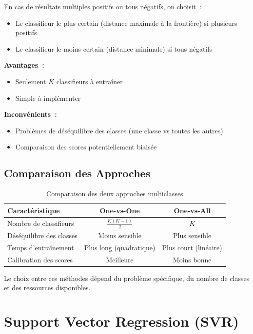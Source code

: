 En cas de résultats multiples positifs ou tous négatifs, on choisit~:
\begin{itemize}
    \item Le classifieur le plus certain (distance maximale à la frontière) si plusieurs positifs
    \item Le classifieur le moins certain (distance minimale) si tous négatifs
\end{itemize}

\textbf{Avantages~:}
\begin{itemize}
    \item Seulement $K$ classifieurs à entraîner
    \item Simple à implémenter
\end{itemize}

\textbf{Inconvénients~:}
\begin{itemize}
    \item Problèmes de déséquilibre des classes (une classe vs toutes les autres)
    \item Comparaison des scores potentiellement biaisée
\end{itemize}

\subsection{Comparaison des Approches}

\begin{table}[h]
    \centering
    \begin{tabular}{|l|c|c|}
        \hline
        \textbf{Caractéristique} & \textbf{One-vs-One} & \textbf{One-vs-All} \\
        \hline
        Nombre de classifieurs   & $\frac{K(K-1)}{2}$  & $K$ \\
        Déséquilibre des classes & Moins sensible       & Plus sensible \\
        Temps d'entraînement     & Plus long (quadratique) & Plus court (linéaire) \\
        Calibration des scores   & Meilleure            & Moins bonne \\
        \hline
    \end{tabular}
    \caption{Comparaison des deux approches multiclasses}
    \label{tab:comparaison}
\end{table}

Le choix entre ces méthodes dépend du problème spécifique, du nombre de classes et des ressources disponibles.

\section{Support Vector Regression (SVR)}

